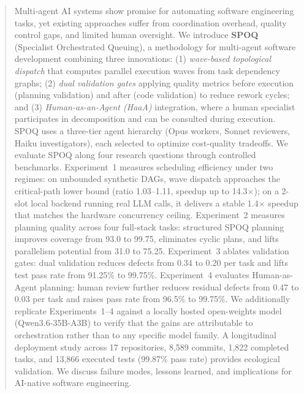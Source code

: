 \begin{abstract}
Multi-agent AI systems show promise for automating software engineering tasks,
yet existing approaches suffer from coordination overhead, quality control gaps,
and limited human oversight. We introduce \textbf{SPOQ} (Specialist Orchestrated
Queuing), a methodology for multi-agent software development combining three
innovations: (1) \textit{wave-based topological dispatch} that computes parallel
execution waves from task dependency graphs; (2) \textit{dual validation gates}
applying quality metrics before execution (planning validation) and after (code
validation) to reduce rework cycles; and (3) \textit{Human-as-an-Agent (HaaA)}
integration, where a human specialist participates in decomposition and can be
consulted during execution. SPOQ uses a three-tier agent hierarchy (Opus
workers, Sonnet reviewers, Haiku investigators), each selected to optimize
cost-quality tradeoffs.
We evaluate SPOQ along four research questions through controlled benchmarks.
Experiment~1 measures scheduling efficiency under two regimes: on unbounded
synthetic DAGs, wave dispatch approaches the critical-path lower bound
(ratio 1.03--1.11, speedup up to 14.3$\times$); on a 2-slot local backend
running real LLM calls, it delivers a stable 1.4$\times$ speedup that matches
the hardware concurrency ceiling. Experiment~2 measures planning quality
across four full-stack tasks: structured SPOQ planning improves coverage from
93.0 to 99.75, eliminates cyclic plans, and lifts parallelism potential from
31.0 to 75.25. Experiment~3 ablates validation gates: dual validation reduces
defects from 0.34 to 0.20 per task and lifts test pass rate from 91.25\% to
99.75\%. Experiment~4 evaluates Human-as-Agent planning: human review further
reduces residual defects from 0.47 to 0.03 per task and raises pass rate from
96.5\% to 99.75\%. We additionally replicate Experiments~1--4 against a locally
hosted open-weights model (Qwen3.6-35B-A3B) to verify that the gains are
attributable to orchestration rather than to any specific model family.
A longitudinal deployment study across 17 repositories, 8{,}589 commits,
1{,}822 completed tasks, and 13{,}866 executed tests (99.87\% pass rate)
provides ecological validation. We discuss failure modes, lessons learned,
and implications for AI-native software engineering.
\end{abstract}
